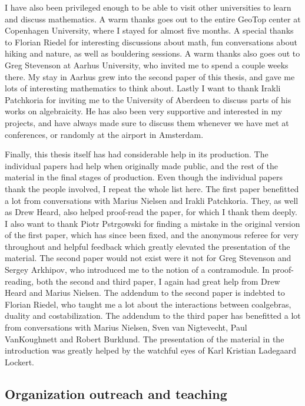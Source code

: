 I have also been privileged enough to be able to visit other universities to learn and discuss mathematics. A warm thanks goes out to the entire GeoTop center at Copenhagen University, where I stayed for almost five months. A special thanks to Florian Riedel for interesting discussions about math, fun conversations about hiking and nature, as well as bouldering sessions. A warm thanks also goes out to Greg Stevenson at Aarhus University, who invited me to spend a couple weeks there. My stay in Aarhus grew into the second paper of this thesis, and gave me lots of interesting mathematics to think about. Lastly I want to thank Irakli Patchkoria for inviting me to the University of Aberdeen to discuss parts of his works on algebraicity. He has also been very supportive and interested in my projects, and have always made sure to discuss them whenever we have met at conferences, or randomly at the airport in Amsterdam. 

Finally, this thesis itself has had considerable help in its production. The individual papers had help when originally made public, and the rest of the material in the final stages of production. Even though the individual papers thank the people involved, I repeat the whole list here. The first paper benefitted a lot from conversations with Marius Nielsen and Irakli Patchkoria. They, as well as Drew Heard, also helped proof-read the paper, for which I thank them deeply. I also want to thank Piotr Pstr\a{}gowski for finding a mistake in the original version of the first paper, which has since been fixed, and the anonymous referee for very throughout and helpful feedback which greatly elevated the presentation of the material. The second paper would not exist were it not for Greg Stevenson and Sergey Arkhipov, who introduced me to the notion of a contramodule. In proof-reading, both the second and third paper, I again had great help from Drew Heard and Marius Nielsen. The addendum to the second paper is indebted to Florian Riedel, who taught me a lot about the interactions between coalgebras, duality and costabilization. The addendum to the third paper has benefitted a lot from conversations with Marius Nielsen, Sven van Nigtevecht, Paul VanKoughnett and Robert Burklund. The presentation of the material in the introduction was greatly helped by the watchful eyes of Karl Kristian Ladegaard Lockert. 


\subsection*{Organization outreach and teaching}

